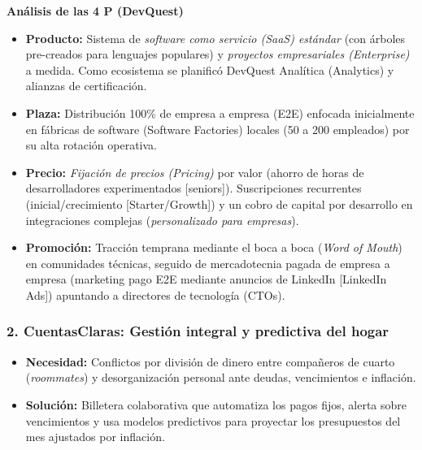 \newpage

\textbf{Análisis de las 4 P (DevQuest)}
\begin{itemize}
    \item \textbf{Producto:} Sistema de \textit{software como servicio (SaaS) estándar} (con árboles pre-creados para lenguajes populares) y \textit{proyectos empresariales (Enterprise)} a medida. Como ecosistema se planificó DevQuest Analítica (Analytics) y alianzas de certificación.
    \item \textbf{Plaza:} Distribución 100\% de empresa a empresa (E2E) enfocada inicialmente en fábricas de software (Software Factories) locales (50 a 200 empleados) por su alta rotación operativa.
    \item \textbf{Precio:} \textit{Fijación de precios (Pricing)} por valor (ahorro de horas de desarrolladores experimentados [seniors]). Suscripciones recurrentes (inicial/crecimiento [Starter/Growth]) y un cobro de capital por desarrollo en integraciones complejas (\textit{personalizado para empresas}).
    \item \textbf{Promoción:} Tracción temprana mediante el boca a boca (\textit{Word of Mouth}) en comunidades técnicas, seguido de mercadotecnia pagada de empresa a empresa (marketing pago E2E mediante anuncios de LinkedIn [LinkedIn Ads]) apuntando a directores de tecnología (CTOs).
\end{itemize}

\subsubsection{2. CuentasClaras: Gestión integral y predictiva del hogar}
\begin{itemize}
    \item \textbf{Necesidad:} Conflictos por división de dinero entre compañeros de cuarto (\textit{roommates}) y desorganización personal ante deudas, vencimientos e inflación.
    \item \textbf{Solución:} Billetera colaborativa que automatiza los pagos fijos, alerta sobre vencimientos y usa modelos predictivos para proyectar los presupuestos del mes ajustados por inflación.
\end{itemize}

